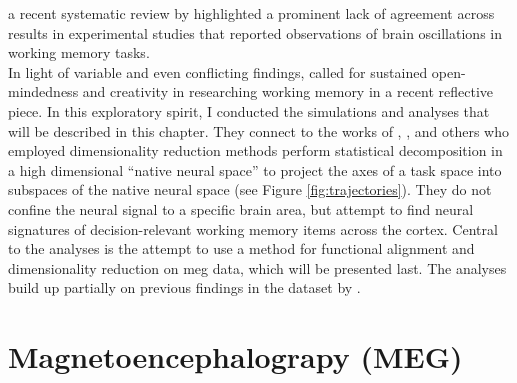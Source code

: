 a recent systematic review by \citet{pavlov2022oscillatory} highlighted a prominent lack of agreement across results in experimental studies that reported observations of brain oscillations in working memory tasks.\\
In light of variable and even conflicting findings, \citet{nobre2022opening} called for sustained open-mindedness and creativity in researching working memory in a recent reflective piece.
In this exploratory spirit, I conducted the simulations and analyses that will be described in this chapter.
They connect to the works of \citet{murray2017stable}, \citet{machens2010functional}, \citet{rigotti2013importance} and others who employed dimensionality reduction methods perform statistical decomposition in a high dimensional ``native neural space'' to
project the axes of a task space into subspaces of the native neural space (see Figure \ref{fig:trajectories}).
They do not confine the neural signal to a specific brain area, but attempt to find neural signatures of decision-relevant working memory items across the cortex.
Central to the analyses is the attempt to use a method for functional alignment and dimensionality reduction on \gls{meg} data, which will be presented last.
The analyses build up partially on previous findings in the dataset by \citet{kaiserposter}.









\section{Magnetoencephalograpy (MEG)}

